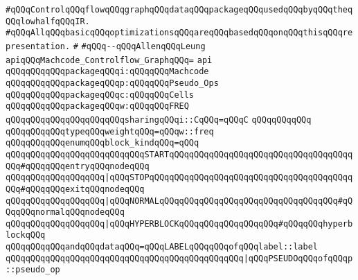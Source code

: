 \label{src/lib/compiler/back/low/ir/lowhalf-mcg.api}
\newline
\verb|#qQQqControlqQQqflowqQQqgraphqQQqdataqQQqpackageqQQqusedqQQqbyqQQqtheqQQqlowhalfqQQqIR.|\newline
\verb|#qQQqAllqQQqbasicqQQqoptimizationsqQQqareqQQqbasedqQQqonqQQqthisqQQqrepresentation.|\newline
\verb|#|\newline
\verb|#qQQq--qQQqAllenqQQqLeung|\newline
\newline
\newline
\verb|apiqQQqMachcode_Controlflow_GraphqQQq=|\newline
\verb|api|\newline
\newline
\verb|qQQqqQQqqQQqpackageqQQqi:qQQqqQQqMachcode|\newline
\verb|qQQqqQQqqQQqpackageqQQqp:qQQqqQQqPseudo_Ops|\newline
\verb|qQQqqQQqqQQqpackageqQQqc:qQQqqQQqCells|\newline
\verb|qQQqqQQqqQQqpackageqQQqw:qQQqqQQqFREQ|\newline
\verb|qQQqqQQqqQQqqQQqqQQqqQQqsharingqQQqi::CqQQq=qQQqC|\newline
\verb|qQQqqQQqqQQq|\newline
\verb|qQQqqQQqqQQqtypeqQQqweightqQQq=qQQqw::freq|\newline
\newline
\verb|qQQqqQQqqQQqenumqQQqblock_kindqQQq=qQQq|\newline
\verb|qQQqqQQqqQQqqQQqqQQqqQQqqQQqSTARTqQQqqQQqqQQqqQQqqQQqqQQqqQQqqQQqqQQqqQQq#qQQqqQQqentryqQQqnodeqQQq|\newline
\verb|qQQqqQQqqQQqqQQqqQQq|\verb#|qQQqSTOPqQQqqQQqqQQqqQQqqQQqqQQqqQQqqQQqqQQqqQQqqQQq#\verb|#qQQqqQQqexitqQQqnodeqQQq|\newline
\verb|qQQqqQQqqQQqqQQqqQQq|\verb#|qQQqNORMALqQQqqQQqqQQqqQQqqQQqqQQqqQQqqQQqqQQq#\verb|#qQQqqQQqnormalqQQqnodeqQQq|\newline
\verb|qQQqqQQqqQQqqQQqqQQq|\verb#|qQQqHYPERBLOCKqQQqqQQqqQQqqQQqqQQq#\verb|#qQQqqQQqhyperblockqQQq|\newline
\newline
\verb|qQQqqQQqqQQqandqQQqdataqQQq=qQQqLABELqQQqqQQqofqQQqlabel::label|\newline
\verb|qQQqqQQqqQQqqQQqqQQqqQQqqQQqqQQqqQQqqQQqqQQqqQQq|\verb#|qQQqPSEUDOqQQqofqQQqp::pseudo_op#\newline
\newline
